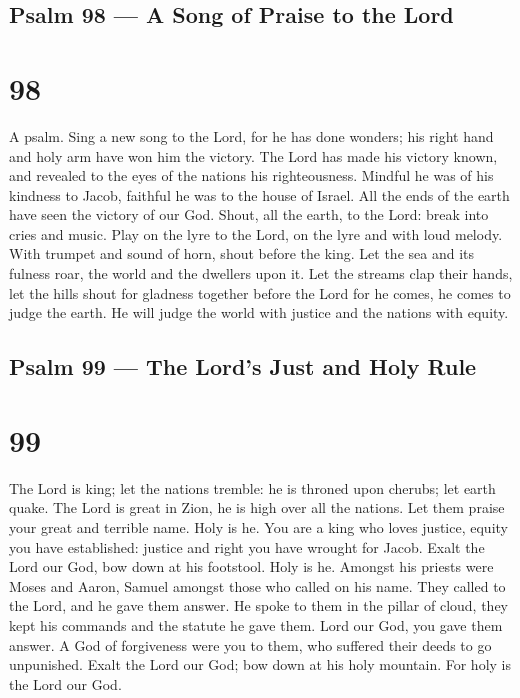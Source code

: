 \hypertarget{psalm-98-a-song-of-praise-to-the-lord}{%
\subsection{Psalm 98 --- A Song of Praise to the
Lord}\label{psalm-98-a-song-of-praise-to-the-lord}}

\hypertarget{section-97}{%
\section{98}\label{section-97}}

A psalm.  Sing a new song to the Lord, for he has done
wonders; his right hand and holy arm have won him the victory.
 The Lord has made his victory known, and revealed to the
eyes of the nations his righteousness.  Mindful he was of
his kindness to Jacob, faithful he was to the house of Israel. All the
ends of the earth have seen the victory of our God.  Shout,
all the earth, to the Lord: break into cries and music. 
Play on the lyre to the Lord, on the lyre and with loud melody.
 With trumpet and sound of horn, shout before the king.
 Let the sea and its fulness roar, the world and the
dwellers upon it.  Let the streams clap their hands, let the
hills shout for gladness together  before the Lord for he
comes, he comes to judge the earth. He will judge the world with justice
and the nations with equity.

\hypertarget{psalm-99-the-lords-just-and-holy-rule}{%
\subsection{Psalm 99 --- The Lord's Just and Holy
Rule}\label{psalm-99-the-lords-just-and-holy-rule}}

\hypertarget{section-98}{%
\section{99}\label{section-98}}

 The Lord is king; let the nations tremble: he is throned
upon cherubs; let earth quake.  The Lord is great in Zion,
he is high over all the nations.  Let them praise your great
and terrible name. Holy is he.  You are a king who loves
justice, equity you have established: justice and right you have wrought
for Jacob.  Exalt the Lord our God, bow down at his
footstool. Holy is he.  Amongst his priests were Moses and
Aaron, Samuel amongst those who called on his name. They called to the
Lord, and he gave them answer.  He spoke to them in the
pillar of cloud, they kept his commands and the statute he gave them.
 Lord our God, you gave them answer. A God of forgiveness
were you to them, who suffered their deeds to go unpunished.
 Exalt the Lord our God; bow down at his holy mountain. For
holy is the Lord our God.


